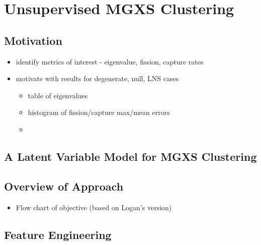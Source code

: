 \chapter{Unsupervised MGXS Clustering}
\label{chap:methodology}


\section{Motivation}
\label{sec:chap6-motivate}

\begin{itemize}[noitemsep]
  \item identify metrics of interest - eigenvalue, fission, capture rates
  \item motivate with results for degenerate, null, LNS cases
  \begin{itemize}[noitemsep]
    \item table of eigenvalues
    \item histogram of fission/capture max/mean errors
    \item 
  \end{itemize}
\end{itemize}


\section{A Latent Variable Model for MGXS Clustering}
\label{sec:chap6-latent-model}


\section{Overview of Approach}
\label{sec:chap6-overview}

\begin{itemize}[noitemsep]
  \item Flow chart of objective (based on Logan's version)
\end{itemize}


\section{Feature Engineering}
\label{sec:chap6-feature-engineer}

